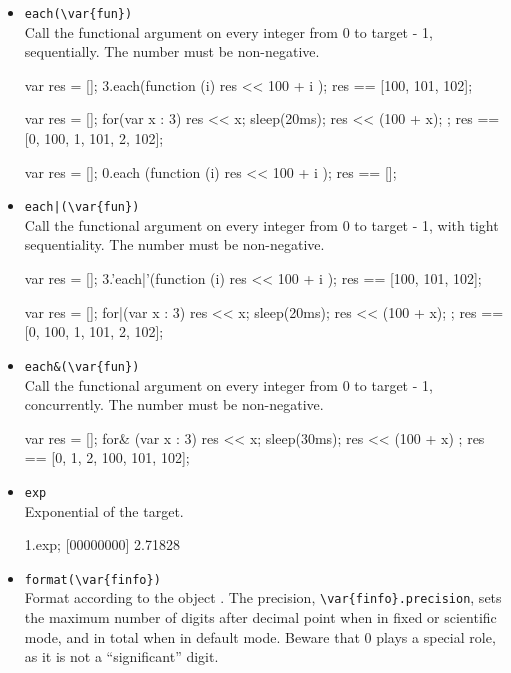 \begin{itemize}
\item \lstinline|each(\var{fun})|\\
  Call the functional argument  on every integer from 0 to
  target - 1, sequentially.  The number must be non-negative.
\begin{urbiassert}[firstnumber=last]
{
  var res = [];
  3.each(function (i) { res << 100 + i });
  res
}
== [100, 101, 102];

{
  var res = [];
  for(var x : 3) { res << x; sleep(20ms); res << (100 + x); };
  res
}
== [0, 100, 1, 101, 2, 102];

{
  var res = [];
  0.each (function (i) { res << 100 + i });
  res
}
== [];
\end{urbiassert}

\item \lstinline'each|(\var{fun})'\\
  Call the functional argument  on every integer from 0 to
  target - 1, with tight sequentiality.  The number must be
  non-negative.
\begin{urbiassert}[firstnumber=last]
{
  var res = [];
  3.'each|'(function (i) { res << 100 + i });
  res
}
== [100, 101, 102];

{
  var res = [];
  for|(var x : 3) { res << x; sleep(20ms); res << (100 + x); };
  res
}
== [0, 100, 1, 101, 2, 102];
\end{urbiassert}%

\item \lstinline|each&(\var{fun})|\\
  Call the functional argument  on every integer from 0 to
  target - 1, concurrently.  The number must be non-negative.
\begin{urbiassert}[firstnumber=last]
{
  var res = [];
  for& (var x : 3) { res << x; sleep(30ms); res << (100 + x) };
  res
}
== [0, 1, 2, 100, 101, 102];
\end{urbiassert}%

\item \lstinline|exp|\\
  Exponential of the target.
\begin{urbiscript}[firstnumber=last]
1.exp;
[00000000] 2.71828
\end{urbiscript}

\item \lstinline|format(\var{finfo})|\\
  Format according to the  object .
  The precision, \lstinline|\var{finfo}.precision|, sets the maximum
  number of digits after decimal point when in fixed or scientific
  mode, and in total when in default mode.  Beware that 0 plays a
  special role, as it is not a ``significant'' digit.


\end{itemize}
